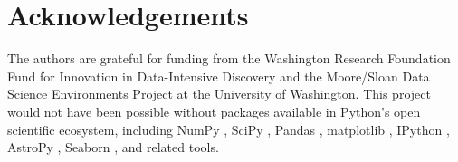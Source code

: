 \documentclass[twocolumn]{aastex6}
\begin{document}


\section*{Acknowledgements}
The authors are grateful for funding from the Washington Research Foundation Fund for Innovation in Data-Intensive Discovery and the Moore/Sloan Data Science Environments Project at the University of Washington. This project would not have been possible without packages available in Python's open scientific ecosystem, including NumPy \citep{NumPy}, SciPy \citep{SciPy}, Pandas \citep{Pandas}, matplotlib \citep{matplotlib}, IPython \citep{IPython}, AstroPy \citep{astropy13}, Seaborn \citep{Seaborn}, and related tools.



\end{document}
